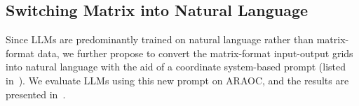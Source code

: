 


\subsection{Switching Matrix into Natural Language}
\label{sec:natural language}
Since LLMs are predominantly trained on natural language rather than matrix-format data, we further propose to convert the matrix-format input-output grids into natural language with the aid of a coordinate system-based prompt (listed in~). We evaluate LLMs using this new prompt on ARAOC, and the results are presented in~.

